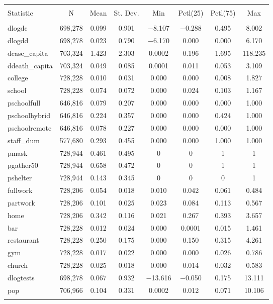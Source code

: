   \caption{} 
  \label{} 
\begin{tabular}{@{\extracolsep{5pt}}lccccccc} 
\\[-1.8ex]\hline 
\hline \\[-1.8ex] 
Statistic & \multicolumn{1}{c}{N} & \multicolumn{1}{c}{Mean} & \multicolumn{1}{c}{St. Dev.} & \multicolumn{1}{c}{Min} & \multicolumn{1}{c}{Pctl(25)} & \multicolumn{1}{c}{Pctl(75)} & \multicolumn{1}{c}{Max} \\ 
\hline \\[-1.8ex] 
dlogdc & 698,278 & 0.099 & 0.901 & $-$8.107 & $-$0.288 & 0.495 & 8.002 \\ 
dlogdd & 698,278 & 0.023 & 0.790 & $-$6.170 & 0.000 & 0.000 & 6.170 \\ 
dcase\_capita & 703,324 & 1.423 & 2.303 & 0.0002 & 0.196 & 1.695 & 118.235 \\ 
ddeath\_capita & 703,324 & 0.049 & 0.085 & 0.0001 & 0.011 & 0.053 & 3.109 \\ 
college & 728,228 & 0.010 & 0.031 & 0.000 & 0.000 & 0.008 & 1.827 \\ 
school & 728,228 & 0.074 & 0.072 & 0.000 & 0.024 & 0.103 & 1.167 \\ 
pschoolfull & 646,816 & 0.079 & 0.207 & 0.000 & 0.000 & 0.000 & 1.000 \\ 
pschoolhybrid & 646,816 & 0.224 & 0.357 & 0.000 & 0.000 & 0.424 & 1.000 \\ 
pschoolremote & 646,816 & 0.078 & 0.227 & 0.000 & 0.000 & 0.000 & 1.000 \\ 
staff\_dum & 577,680 & 0.293 & 0.455 & 0.000 & 0.000 & 1.000 & 1.000 \\ 
pmask & 728,944 & 0.461 & 0.495 & 0 & 0 & 1 & 1 \\ 
pgather50 & 728,944 & 0.658 & 0.472 & 0 & 0 & 1 & 1 \\ 
pshelter & 728,944 & 0.143 & 0.345 & 0 & 0 & 0 & 1 \\ 
fullwork & 728,206 & 0.054 & 0.018 & 0.010 & 0.042 & 0.061 & 0.484 \\ 
partwork & 728,206 & 0.101 & 0.025 & 0.023 & 0.084 & 0.113 & 0.567 \\ 
home & 728,206 & 0.342 & 0.116 & 0.021 & 0.267 & 0.393 & 3.657 \\ 
bar & 728,228 & 0.012 & 0.024 & 0.000 & 0.0001 & 0.015 & 1.461 \\ 
restaurant & 728,228 & 0.250 & 0.175 & 0.000 & 0.150 & 0.315 & 4.261 \\ 
gym & 728,228 & 0.017 & 0.022 & 0.000 & 0.000 & 0.026 & 0.786 \\ 
church & 728,228 & 0.025 & 0.018 & 0.000 & 0.014 & 0.032 & 0.583 \\ 
dlogtests & 698,278 & 0.067 & 0.932 & $-$13.616 & $-$0.050 & 0.175 & 13.111 \\ 
pop & 706,966 & 0.104 & 0.331 & 0.0002 & 0.012 & 0.071 & 10.106 \\ 
\hline \\[-1.8ex] 
\end{tabular} 
